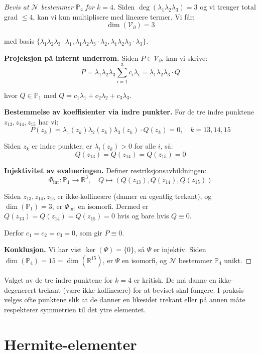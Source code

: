 \documentclass[../../main.tex]{subfiles}
\begin{document}
\begin{proof}[Bevis at $\mathcal{N}$ bestemmer $\mathbb{P}_4$ for $k=4$]
Siden $\deg(\lambda_1 \lambda_2 \lambda_3) = 3$ og vi trenger total grad $\leq 4$, kan vi kun multiplisere med lineære termer. Vi får:
\[
    \dim(\mathcal{V}_{\partial}) = 3
\]

med basis $\{\lambda_1 \lambda_2 \lambda_3 \cdot \lambda_1, \lambda_1 \lambda_2 \lambda_3 \cdot \lambda_2, \lambda_1 \lambda_2 \lambda_3 \cdot \lambda_3\}$.

\textbf{Projeksjon på internt underrom.} Siden $P \in \mathcal{V}_{\partial}$, kan vi skrive:
\[
    P = \lambda_1 \lambda_2 \lambda_3 \sum_{i=1}^3 c_i \lambda_i = \lambda_1 \lambda_2 \lambda_3 \cdot Q
\]

hvor $Q \in \mathbb{P}_1$ med $Q = c_1 \lambda_1 + c_2 \lambda_2 + c_3 \lambda_3$.

\textbf{Bestemmelse av koeffisienter via indre punkter.} For de tre indre punktene $z_{13}, z_{14}, z_{15}$ har vi:
\[
    P(z_k) = \lambda_1(z_k) \lambda_2(z_k) \lambda_3(z_k) \cdot Q(z_k) = 0, \quad k = 13, 14, 15
\]

Siden $z_k$ er indre punkter, er $\lambda_i(z_k) > 0$ for alle $i$, så:
\[
    Q(z_{13}) = Q(z_{14}) = Q(z_{15}) = 0
\]

\textbf{Injektivitet av evalueringen.} Definer restriksjonsavbildningen:
\[
    \Phi_{\text{int}}: \mathbb{P}_1 \to \mathbb{R}^3, \quad Q \mapsto (Q(z_{13}), Q(z_{14}), Q(z_{15}))
\]

Siden $z_{13}, z_{14}, z_{15}$ er ikke-kollineære (danner en egentlig trekant), og $\dim(\mathbb{P}_1) = 3$, er $\Phi_{\text{int}}$ en isomorfi. Dermed er $Q(z_{13}) = Q(z_{14}) = Q(z_{15}) = 0$ hvis og bare hvis $Q \equiv 0$.

Derfor $c_1 = c_2 = c_3 = 0$, som gir $P \equiv 0$.

\textbf{Konklusjon.} Vi har vist $\ker(\Psi) = \{0\}$, så $\Psi$ er injektiv. Siden $\dim(\mathbb{P}_4) = 15 = \dim(\mathbb{R}^{15})$, er $\Psi$ en isomorfi, og $\mathcal{N}$ bestemmer $\mathbb{P}_4$ unikt.
\end{proof}

\begin{remark}{}{}
Valget av de tre indre punktene for $k=4$ er kritisk. De må danne en ikke-degenerert trekant (være ikke-kollineære) for at beviset skal fungere. I praksis velges ofte punktene slik at de danner en likesidet trekant eller på annen måte respekterer symmetrien til det ytre elementet.
\end{remark}

\section{Hermite-elementer}
\end{document}
